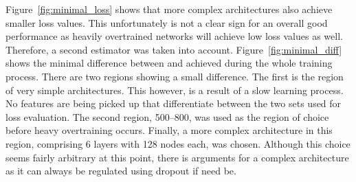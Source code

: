 Figure~\ref{fig:minimal_loss} shows that more complex architectures also achieve smaller loss values. This unfortunately is not a clear sign for an overall good performance as heavily overtrained networks will achieve low loss values as well. Therefore, a second estimator was taken into account. Figure~\ref{fig:minimal_diff} shows the minimal difference between \losstrain and \losstest achieved during the whole training process. There are two regions showing a small difference. The first is the region of very simple architectures. This however, is a result of a slow learning process. No features are being picked up that differentiate between the two sets used for loss evaluation. The second region, \numrange{500}{800}, was used as the region of choice before heavy overtraining occurs. Finally, a more complex architecture in this region, comprising \num{6} layers with \num{128} nodes each, was chosen. Although this choice seems fairly arbitrary at this point, there is arguments for a complex architecture as it can always be regulated using dropout if need be.




